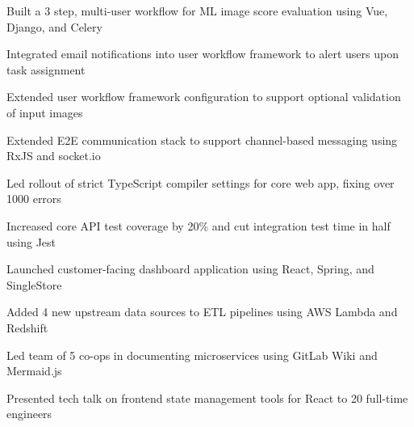 \documentclass[]{deedy-resume}
\begin{document}
\begin{tightemize}
\item Built a 3 step, multi-user workflow for ML image score evaluation using Vue, Django, and Celery
\item Integrated email notifications into user workflow framework to alert users upon task assignment
\item Extended user workflow framework configuration to support optional validation of input images
\end{tightemize}
\sectionsep

\begin{tightemize}
\item Extended E2E communication stack to support channel-based messaging using RxJS and socket.io
\item Led rollout of strict TypeScript compiler settings for core web app, fixing over 1000 errors 
\item Increased core API test coverage by 20\% and cut integration test time in half using Jest 
\end{tightemize}
\sectionsep

\begin{tightemize}
\item Launched customer-facing dashboard application using React, Spring, and SingleStore
\item Added 4 new upstream data sources to ETL pipelines using AWS Lambda and Redshift
\item Led team of 5 co-ops in documenting microservices using GitLab Wiki and Mermaid.js
\item Presented tech talk on frontend state management tools for React to 20 full-time engineers
\end{tightemize}
\sectionsep

\end{document}
